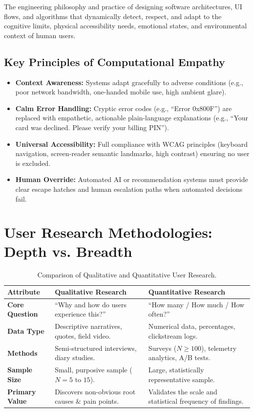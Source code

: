 \begin{definition}
The engineering philosophy and practice of designing software architectures, UI flows, and algorithms that dynamically detect, respect, and adapt to the cognitive limits, physical accessibility needs, emotional states, and environmental context of human users.
\end{definition}

\subsection{Key Principles of Computational Empathy}
\begin{itemize}[leftmargin=1.2em, itemsep=3pt]
    \item \textbf{Context Awareness:} Systems adapt gracefully to adverse conditions (e.g., poor network bandwidth, one-handed mobile use, high ambient glare).
    \item \textbf{Calm Error Handling:} Cryptic error codes (e.g., ``Error 0x800F'') are replaced with empathetic, actionable plain-language explanations (e.g., ``Your card was declined. Please verify your billing PIN'').
    \item \textbf{Universal Accessibility:} Full compliance with WCAG principles (keyboard navigation, screen-reader semantic landmarks, high contrast) ensuring no user is excluded.
    \item \textbf{Human Override:} Automated AI or recommendation systems must provide clear escape hatches and human escalation paths when automated decisions fail.
\end{itemize}

\section{User Research Methodologies: Depth vs. Breadth}

\begin{table}[h!]
\centering
\small
\renewcommand{\arraystretch}{1.3}
\begin{tabularx}{\linewidth}{p{3.2cm}X X}
\toprule
\textbf{Attribute} & \textbf{Qualitative Research} & \textbf{Quantitative Research} \\
\midrule
\textbf{Core Question} & ``Why and how do users experience this?'' & ``How many / How much / How often?'' \\
\textbf{Data Type} & Descriptive narratives, quotes, field video. & Numerical data, percentages, clickstream logs. \\
\textbf{Methods} & Semi-structured interviews, diary studies. & Surveys ($N \ge 100$), telemetry analytics, A/B tests. \\
\textbf{Sample Size} & Small, purposive sample ($N = 5 \text{ to } 15$). & Large, statistically representative sample. \\
\textbf{Primary Value} & Discovers non-obvious root causes \& pain points. & Validates the scale and statistical frequency of findings. \\
\bottomrule
\end{tabularx}
\caption{Comparison of Qualitative and Quantitative User Research.}
\end{table}

